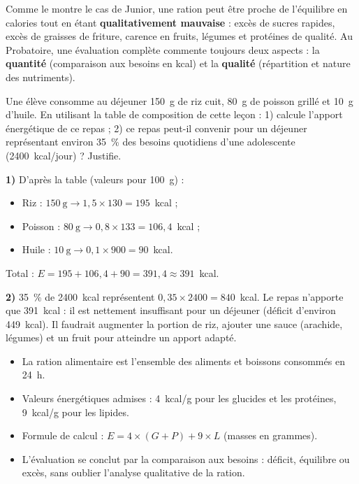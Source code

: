\documentclass[11pt]{article}
\newcommand{\cle}[1]{{\popxbold\color{popdark}#1}}
\begin{document}
\begin{attention}
Comme le montre le cas de Junior, une ration peut être proche de l'équilibre en calories tout en étant \textbf{qualitativement mauvaise} : excès de sucres rapides, excès de graisses de friture, carence en fruits, légumes et protéines de qualité. Au Probatoire, une évaluation complète commente toujours deux aspects : la \textbf{quantité} (comparaison aux besoins en kcal) et la \textbf{qualité} (répartition et nature des nutriments).
\end{attention}

\begin{exercice}
Une élève consomme au déjeuner 150~g de riz cuit, 80~g de poisson grillé et 10~g d'huile. En utilisant la table de composition de cette leçon : 1) calcule l'apport énergétique de ce repas ; 2) ce repas peut-il convenir pour un déjeuner représentant environ 35~\% des besoins quotidiens d'une adolescente (\num{2400}~kcal/jour) ? Justifie.
\end{exercice}

\begin{corrige}
\textbf{1)} D'après la table (valeurs pour 100~g) :
\begin{itemize}
\item Riz : $150~\text{g} \rightarrow 1,5 \times 130 = 195$~kcal ;
\item Poisson : $80~\text{g} \rightarrow 0,8 \times 133 = 106,4$~kcal ;
\item Huile : $10~\text{g} \rightarrow 0,1 \times 900 = 90$~kcal.
\end{itemize}
Total : $E = 195 + 106,4 + 90 = 391,4 \approx 391$~kcal.

\textbf{2)} 35~\% de \num{2400}~kcal représentent $0,35 \times 2400 = 840$~kcal. Le repas n'apporte que 391~kcal : il est nettement insuffisant pour un déjeuner (déficit d'environ 449~kcal). Il faudrait augmenter la portion de riz, ajouter une sauce (arachide, légumes) et un fruit pour atteindre un apport adapté.
\end{corrige}

\begin{aretenir}
\begin{itemize}
\item La \cle{ration alimentaire} est l'ensemble des aliments et boissons consommés en 24~h.
\item Valeurs énergétiques admises : 4~kcal/g pour les glucides et les protéines, 9~kcal/g pour les lipides.
\item Formule de calcul : $E = 4 \times (G + P) + 9 \times L$ (masses en grammes).
\item L'évaluation se conclut par la comparaison aux besoins : déficit, équilibre ou excès, sans oublier l'analyse qualitative de la ration.
\end{itemize}
\end{aretenir}
\end{document}
